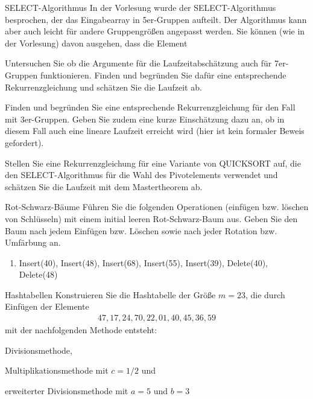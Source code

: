 \documentclass{exercisesheet}
\begin{document}
\begin{eexercises}{SELECT-Algorithmus}{
    In der Vorlesung wurde der SELECT-Algorithmus besprochen, der das Eingabearray in 5er-Gruppen aufteilt. Der Algorithmus kann aber auch leicht für andere Gruppengrößen angepasst werden. Sie können (wie in der Vorlesung) davon ausgehen, dass die Element
  }
  \item Untersuchen Sie ob die Argumente für die Laufzeitabschätzung auch für 7er-Gruppen funktionieren. Finden und begründen Sie dafür eine entsprechende Rekurrenzgleichung und schätzen Sie die Laufzeit ab.
  \item Finden und begründen Sie eine entsprechende Rekurrenzgleichung für den Fall mit 3er-Gruppen. Geben Sie zudem eine kurze Einschätzung dazu an, ob in diesem Fall auch eine lineare Laufzeit erreicht wird (hier ist kein formaler Beweis gefordert).
  \item Stellen Sie eine Rekurrenzgleichung für eine Variante von QUICKSORT auf, die den SELECT-Algorithmus für die Wahl des Pivotelements verwendet und schätzen Sie die Laufzeit mit dem Mastertheorem ab.
\end{eexercises}



\begin{exercise}{Rot-Schwarz-Bäume}
  Führen Sie die folgenden Operationen (einfügen bzw. löschen von Schlüsseln) mit einem initial leeren Rot-Schwarz-Baum aus. Geben Sie den Baum nach jedem Einfügen bzw. Löschen sowie nach jeder Rotation bzw. Umfärbung an.
  \begin{enumerate}
    \item Insert(40), Insert(48), Insert(68), Insert(55), Insert(39), Delete(40), Delete(48)
  \end{enumerate}
\end{exercise}

\begin{eexercises}{Hashtabellen}{
    Konstruieren Sie die Hashtabelle der Größe $m = 23$, die durch Einfügen der Elemente
    \begin{align*}
      47, 17, 24, 70, 22, 01, 40, 45, 36, 59
    \end{align*}
    mit der nachfolgenden Methode entsteht:
  }
  \item Divisionsmethode,
  \item Multiplikationsmethode mit $c = 1/2$ und
  \item erweiterter Divisionsmethode mit $a = 5$ und $b = 3$
\end{eexercises}
\end{document}
